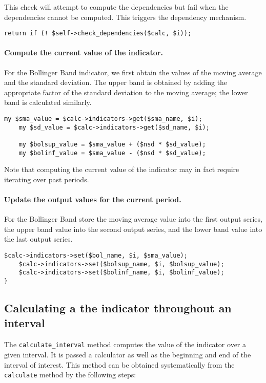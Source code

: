 \documentclass[11pt,twoside]{article}
\begin{document}
This check will attempt to compute the
dependencies but fail when the dependencies cannot be computed. This
triggers the dependency mechanism.

\begin{lstlisting}[name=example]
    return if (! $self->check_dependencies($calc, $i));

\end{lstlisting}

\paragraph{Compute the current value of the indicator.}

For the Bollinger Band indicator, we first obtain the values of the
moving average and the standard deviation. The upper band is obtained
by adding the appropriate factor of the standard deviation to the
moving average; the lower band is calculated similarly.

\begin{lstlisting}[name=example]
    my $sma_value = $calc->indicators->get($sma_name, $i);
    my $sd_value = $calc->indicators->get($sd_name, $i);

    my $bolsup_value = $sma_value + ($nsd * $sd_value);
    my $bolinf_value = $sma_value - ($nsd * $sd_value);

\end{lstlisting}
Note that computing the current value of the indicator may in fact
require iterating over past periods.

\paragraph{Update the output values for the current period.}

For the Bollinger Band store the moving average value into the first
output series, the upper band value into the second output series, and
the lower band value into the last output series.

\begin{lstlisting}[name=example]
    $calc->indicators->set($bol_name, $i, $sma_value);
    $calc->indicators->set($bolsup_name, $i, $bolsup_value);
    $calc->indicators->set($bolinf_name, $i, $bolinf_value);
}

\end{lstlisting}

\subsection[Calculating a the indicator throughout an
interval]{\label{bkm:Ref192603010}Calculating a the indicator
throughout an interval}
The \lstinline!calculate_interval! method computes the value of
the indicator over a given interval. It is passed a calculator as well
as the beginning and end of the interval of interest. This method can
be obtained systematically from the \lstinline!calculate!
method by the following steps:
\end{document}
